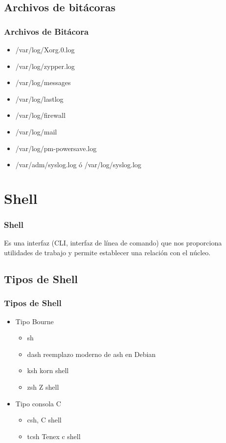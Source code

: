 \documentclass{beamer}
\begin{document}
\subsection{Archivos de bit\'acoras}
\begin{frame}
\frametitle{Archivos de Bit\'acora}
\begin{itemize}
\item /var/log/Xorg.0.log
\item /var/log/zypper.log 
\item /var/log/messages
\item /var/log/lastlog
\item /var/log/firewall
\item /var/log/mail
\item /var/log/pm-powersave.log
\item /var/adm/syslog.log \'o /var/log/syslog.log
\end{itemize}
\end{frame} 


\section{Shell}
\begin{frame}
\frametitle{ Shell }
\begin{definition}
Es una interfaz (CLI, interfaz de l\'inea de comando) que nos proporciona utilidades de trabajo y permite establecer una relaci\'on con el n\'ucleo.
\end{definition}
\end{frame} 

\subsection{Tipos de Shell}
\begin{frame}
\frametitle{ Tipos de Shell }
	\begin{itemize}
		\item Tipo Bourne
		\begin{itemize}
			\item sh
			\item dash reemplazo moderno de ash en Debian
			\item ksh korn shell
			\item zsh Z shell
		\end{itemize}
		\item Tipo consola C
		\begin{itemize}
			\item csh, C shell
			\item tcsh Tenex c shell
		\end{itemize}
	\end{itemize}
\end{frame}
\end{document}
